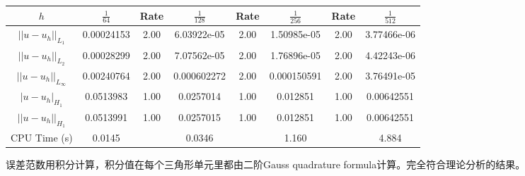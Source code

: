 \documentclass[lang=cn,11pt,a4paper]{elegantpaper}
\begin{document}
\begin{table}[H]
    \centering
    \begin{tabular}{|c|c|c|c|c|c|c|c|}
    \hline
    $h$                    & $\frac{1}{64}$ & Rate & $\frac{1}{128}$ & Rate & $\frac{1}{256}$ & Rate & $\frac{1}{512}$ \\ \hline
    $||u-u_h||_{L_1}$      & 0.00024153     & 2.00 & 6.03922e-05     & 2.00 & 1.50985e-05     & 2.00 & 3.77466e-06     \\ \hline
    $||u-u_h||_{L_2}$      & 0.00028299     & 2.00 & 7.07562e-05     & 2.00 & 1.76896e-05     & 2.00 & 4.42243e-06     \\ \hline
    $||u-u_h||_{L_\infty}$ & 0.00240764     & 2.00 & 0.000602272     & 2.00 & 0.000150591     & 2.00 & 3.76491e-05     \\ \hline
    $|u-u_h|_{H_1}$        & 0.0513983      & 1.00 & 0.0257014       & 1.00 & 0.012851        & 1.00 & 0.00642551     \\ \hline
    $||u-u_h||_{H_1}$      & 0.0513991      & 1.00 & 0.0257015       & 1.00 & 0.012851        & 1.00 & 0.00642551     \\ \hline
    CPU Time (s)           & 0.0145         &      & 0.0346          &      & 1.160           &      & 4.884     \\ \hline
    \end{tabular}
\end{table}

误差范数用积分计算，积分值在每个三角形单元里都由二阶Gauss quadrature formula计算。完全符合理论分析的结果。

\appendix
\addappheadtotoc
\end{document}
